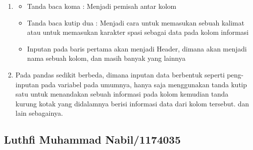 \begin{enumerate}
			\item 
				\begin {itemize} 
					\item Tanda baca koma : Menjadi pemisah antar kolom
					\item Tanda baca kutip dua : Menjadi cara untuk memasukan sebuah kalimat atau untuk memasukan karakter spasi sebagai data pada kolom informasi
					\item Inputan pada baris pertama akan menjadi Header, dimana akan menjadi nama sebuah kolom, dan masih banyak yang lainnya
				\end{itemize}
			
			\item Pada pandas sedikit berbeda, dimana inputan data berbentuk seperti peng-inputan pada variabel pada umumnya, hanya saja menggunakan tanda kutip satu untuk menandakan sebuah informasi pada kolom kemudian tanda kurung kotak yang didalamnya berisi informasi data dari kolom tersebut. dan lain sebagainya.
			
		\end{enumerate}

\subsection{Luthfi Muhammad Nabil/1174035}
